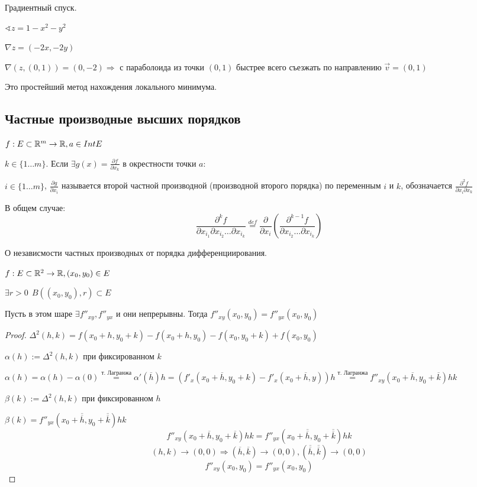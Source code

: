 \begin{example}
    Градиентный спуск.

    $\sphericalangle z=1-x^2-y^2$

    $\nabla z=(-2x, -2y)$

    $\nabla (z, (0, 1)) = (0, -2) \Rightarrow$ с параболоида из точки $(0, 1)$ быстрее всего съезжать по направлению $\vec v=(0, 1)$

    Это простейший метод нахождения локального минимума.
\end{example}

\subsection*{\centering Частные производные высших порядков}

$f : E\subset\mathbb{R}^m \to\mathbb{R}, a\in Int E$

$k\in\{1\ldots m\}$. Если $\exists g(x)=\frac{\partial f}{\partial x_k}$ в окрестности точки $a$:

$i\in\{1\ldots m\}$, $\frac{\partial g}{\partial x_i}$ называется второй частной производной (производной второго порядка) по переменным $i$ и $k$, обозначается $\frac{\partial^2 f}{\partial x_i \partial x_k}$

В общем случае:
$$\frac{\partial^k f}{\partial x_{i_1}\partial x_{i_2}\ldots \partial x_{i_k}}\stackrel{def}{=}\frac{\partial}{\partial x_i}\left(\frac{\partial^{k-1} f}{\partial x_{i_2}\ldots \partial x_{i_k}}\right)$$

\begin{theorem}
    О независмости частных производных от порядка дифференциирования.
    
    $f: E\subset\mathbb{R}^2\to\mathbb{R}, (x_0, y_0)\in E$

    $\exists r>0 \ \ B((x_0, y_0), r)\subset E$

    Пусть в этом шаре $\exists f''_{xy}, f''_{yx}$ и они непрерывны. Тогда $f''_{xy}(x_0, y_0)=f''_{yx}(x_0, y_0)$
\end{theorem}
\begin{proof}
    $\Delta^2(h, k)=f(x_0 + h, y_0 + k) - f(x_0 + h, y_0) - f(x_0, y_0 + k) + f(x_0, y_0)$

    $\alpha(h):=\Delta^2(h, k)$ при фиксированном $k$

    $\alpha(h)=\alpha(h)-\alpha(0)\stackrel{\text{т. Лагранжа}}=\alpha'(\overline h)h=(f'_x (x_0 + \overline h, y_0 + k) - f'_x(x_0+\overline h, y))h\stackrel{\text{т. Лагранжа}}= f''_{xy}(x_0+\overline h, y_0+\overline k)hk$

    $\beta(k):=\Delta^2(h, k)$ при фиксированном $h$
    
    $\beta(k)=f''_{yx}(x_0+\overline{\overline h}, y_0+\overline{\overline k})hk$
    $$f''_{xy}(x_0+\overline h, y_0+\overline k)hk=f''_{yx}(x_0+\overline{\overline h}, y_0+\overline{\overline k})hk$$
    $$(h, k)\to (0, 0) \Rightarrow (\overline h, \overline k)\to(0, 0), (\overline{\overline h}, \overline{\overline k})\to(0, 0)$$
    $$f''_{xy}(x_0, y_0)=f''_{yx}(x_0, y_0)$$
\end{proof}

